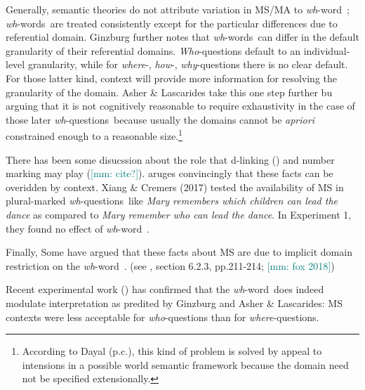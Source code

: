 \documentclass[12pt,letterpaper,table,svgnames,dvipsnames]{article}
\newcommand{\mm}[1]{\textcolor{teal}{[mm: #1]}}
\newcommand{\whqs}{\emph{wh}-questions~}
\newcommand{\whw}{\emph{wh}-word~}
\newcommand{\whws}{\emph{wh}-words~}
\begin{document}
Generally, semantic theories do not attribute variation in MS/MA to \whw; \whws are treated consistently except for the particular differences due to referential domain. Ginzburg further notes that \whws can differ in the default granularity of their referential domains. \emph{Who}-questions default to an individual-level granularity, while for \emph{where}-, \emph{how}-, \emph{why}-questions there is no clear default. For those latter kind, context will provide more information for resolving the granularity of the domain. Asher \& Lascarides take this one step further bu arguing that it is not cognitively reasonable to require exhaustivity in the case of those later \whqs because usually the domains cannot be \emph{apriori} constrained enough to a reasonable size.\footnote{According to Dayal (p.c.), this kind of problem is solved by appeal to intensions in a possible world semantic framework because the domain need not be specified extensionally.}

There has been some disucssion about the role that d-linking (\cite{pesetsky1987}) and number marking may play (\mm{cite?}).  aruges convincingly that these facts can be overidden by context. Xiang \& Cremers (2017) tested the availability of MS in plural-marked \whqs like \emph{Mary remembers which children can lead the dance} as compared to \emph{Mary remember who can lead the dance}. In Experiment 1, they found no effect of \whw.  

Finally, Some have argued that these facts about MS are due to implicit domain restriction on the \whw. (see \cite{george2011}, section 6.2.3, pp.211-214; \mm{fox 2018})

Recent experimental work (\cite{moyer2020,moyersyrett2019}) has confirmed that the \whw does indeed modulate interpretation as predited by Ginzburg and Asher \& Lascarides: MS contexts were less acceptable for \emph{who}-questions than for \emph{where}-questions.
\end{document}
